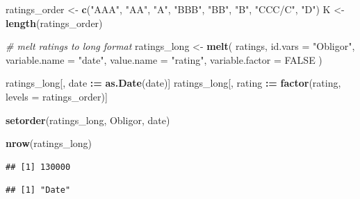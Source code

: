 \documentclass[
  11pt,
]{article}
\newenvironment{Shaded}{\begin{snugshade}}{\end{snugshade}}
\newcommand{\AttributeTok}[1]{\textcolor[rgb]{0.13,0.29,0.53}{#1}}
\newcommand{\CommentTok}[1]{\textcolor[rgb]{0.56,0.35,0.01}{\textit{#1}}}
\newcommand{\ConstantTok}[1]{\textcolor[rgb]{0.56,0.35,0.01}{#1}}
\newcommand{\FunctionTok}[1]{\textcolor[rgb]{0.13,0.29,0.53}{\textbf{#1}}}
\newcommand{\NormalTok}[1]{#1}
\newcommand{\OtherTok}[1]{\textcolor[rgb]{0.56,0.35,0.01}{#1}}
\newcommand{\SpecialCharTok}[1]{\textcolor[rgb]{0.81,0.36,0.00}{\textbf{#1}}}
\newcommand{\StringTok}[1]{\textcolor[rgb]{0.31,0.60,0.02}{#1}}
\begin{document}
\begin{Shaded}
\begin{Highlighting}[]
\NormalTok{ratings\_order }\OtherTok{\textless{}{-}} \FunctionTok{c}\NormalTok{(}\StringTok{"AAA"}\NormalTok{, }\StringTok{"AA"}\NormalTok{, }\StringTok{"A"}\NormalTok{, }\StringTok{"BBB"}\NormalTok{, }\StringTok{"BB"}\NormalTok{, }\StringTok{"B"}\NormalTok{, }\StringTok{"CCC/C"}\NormalTok{, }\StringTok{"D"}\NormalTok{)}
\NormalTok{K }\OtherTok{\textless{}{-}} \FunctionTok{length}\NormalTok{(ratings\_order)}

\CommentTok{\# melt ratings to long format}
\NormalTok{ratings\_long }\OtherTok{\textless{}{-}} \FunctionTok{melt}\NormalTok{(}
\NormalTok{    ratings,}
    \AttributeTok{id.vars =} \StringTok{"Obligor"}\NormalTok{,}
    \AttributeTok{variable.name =} \StringTok{"date"}\NormalTok{,}
    \AttributeTok{value.name =} \StringTok{"rating"}\NormalTok{,}
    \AttributeTok{variable.factor =} \ConstantTok{FALSE}
\NormalTok{)}

\NormalTok{ratings\_long[, date }\SpecialCharTok{:=} \FunctionTok{as.Date}\NormalTok{(date)]}
\NormalTok{ratings\_long[, rating }\SpecialCharTok{:=} \FunctionTok{factor}\NormalTok{(rating, }\AttributeTok{levels =}\NormalTok{ ratings\_order)]}


\FunctionTok{setorder}\NormalTok{(ratings\_long, Obligor, date)}

\FunctionTok{nrow}\NormalTok{(ratings\_long)}
\end{Highlighting}
\end{Shaded}

\begin{verbatim}
## [1] 130000
\end{verbatim}

\begin{Shaded}
\end{Shaded}

\begin{verbatim}
## [1] "Date"
\end{verbatim}

\begin{Shaded}
\end{Shaded}
\end{document}
